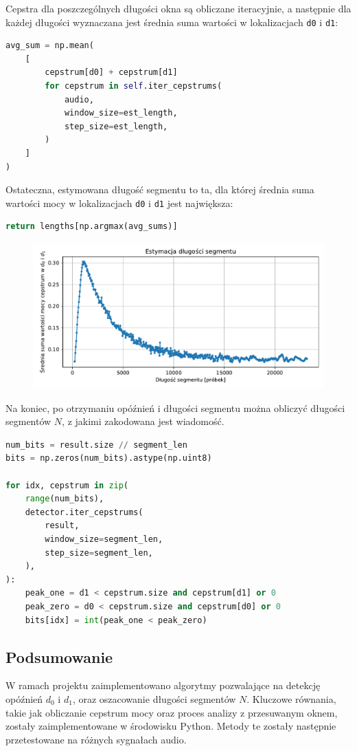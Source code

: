 Cepstra dla poszczególnych długości okna są obliczane iteracyjnie, a następnie dla każdej długości wyznaczana jest średnia suma wartości w lokalizacjach \verb|d0| i \verb|d1|:

\begin{lstlisting}[language=Python]
avg_sum = np.mean(
    [
        cepstrum[d0] + cepstrum[d1]
        for cepstrum in self.iter_cepstrums(
            audio,
            window_size=est_length,
            step_size=est_length,
        )
    ]
)
\end{lstlisting}

Ostateczna, estymowana długość segmentu to ta, dla której średnia suma wartości mocy w lokalizacjach \verb|d0| i \verb|d1| jest największa:

\begin{lstlisting}[language=Python]
return lengths[np.argmax(avg_sums)]
\end{lstlisting}

\begin{figure}[ht!]
	\centering
	\includegraphics[width=\textwidth]{./img/plot_echo_segment_length.pdf}
\end{figure}

Na koniec, po otrzymaniu opóźnień i długości segmentu można obliczyć długości segmentów $N$, z jakimi zakodowana jest wiadomość.

\begin{lstlisting}[language=Python]
num_bits = result.size // segment_len
bits = np.zeros(num_bits).astype(np.uint8)

for idx, cepstrum in zip(
    range(num_bits),
    detector.iter_cepstrums(
        result,
        window_size=segment_len,
        step_size=segment_len,
    ),
):
    peak_one = d1 < cepstrum.size and cepstrum[d1] or 0
    peak_zero = d0 < cepstrum.size and cepstrum[d0] or 0
    bits[idx] = int(peak_one < peak_zero)
\end{lstlisting}

\subsection{Podsumowanie}

W ramach projektu zaimplementowano algorytmy pozwalające na detekcję opóźnień $d_0$ i $d_1$, oraz oszacowanie długości segmentów $N$. Kluczowe równania, takie jak obliczanie cepstrum mocy oraz proces analizy z przesuwanym oknem, zostały zaimplementowane w środowisku Python. Metody te zostały następnie przetestowane na różnych sygnałach audio.
